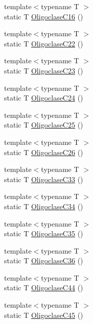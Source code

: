 \begin{DoxyCompactItemize}
{\footnotesize template$<$typename T $>$ }\\static T \mbox{\hyperlink{namespacempc_1_1data_a01c1d37994926a3f583c3a09085e7dd7}{Oligoclase\+C16}} ()
\item 
{\footnotesize template$<$typename T $>$ }\\static T \mbox{\hyperlink{namespacempc_1_1data_ae6a6b1385beb304d3f49551aeb8e63b7}{Oligoclase\+C22}} ()
\item 
{\footnotesize template$<$typename T $>$ }\\static T \mbox{\hyperlink{namespacempc_1_1data_a222bda32032fa07e51a3f2ca77d7c890}{Oligoclase\+C23}} ()
\item 
{\footnotesize template$<$typename T $>$ }\\static T \mbox{\hyperlink{namespacempc_1_1data_a27202f24e8ee8744db3800eb9e456a67}{Oligoclase\+C24}} ()
\item 
{\footnotesize template$<$typename T $>$ }\\static T \mbox{\hyperlink{namespacempc_1_1data_a36d3825843ccf8903e127e3ea028fdd2}{Oligoclase\+C25}} ()
\item 
{\footnotesize template$<$typename T $>$ }\\static T \mbox{\hyperlink{namespacempc_1_1data_a73d2281395f90ec9dd33b08123094178}{Oligoclase\+C26}} ()
\item 
{\footnotesize template$<$typename T $>$ }\\static T \mbox{\hyperlink{namespacempc_1_1data_acad833c03164b8545eed13ac587783af}{Oligoclase\+C33}} ()
\item 
{\footnotesize template$<$typename T $>$ }\\static T \mbox{\hyperlink{namespacempc_1_1data_a425521c883ad46c92e6796d1252e7901}{Oligoclase\+C34}} ()
\item 
{\footnotesize template$<$typename T $>$ }\\static T \mbox{\hyperlink{namespacempc_1_1data_a514b5667234620780080d8bacda7253e}{Oligoclase\+C35}} ()
\item 
{\footnotesize template$<$typename T $>$ }\\static T \mbox{\hyperlink{namespacempc_1_1data_ab0fde1910dad027f1f22483aea8e2d25}{Oligoclase\+C36}} ()
\item 
{\footnotesize template$<$typename T $>$ }\\static T \mbox{\hyperlink{namespacempc_1_1data_aa6354a2af96bd73204a7f79a2b87445c}{Oligoclase\+C44}} ()
\item 
{\footnotesize template$<$typename T $>$ }\\static T \mbox{\hyperlink{namespacempc_1_1data_a52e3aa447b550fe8e1373c1d640a3b8b}{Oligoclase\+C45}} ()

\end{DoxyCompactItemize}
